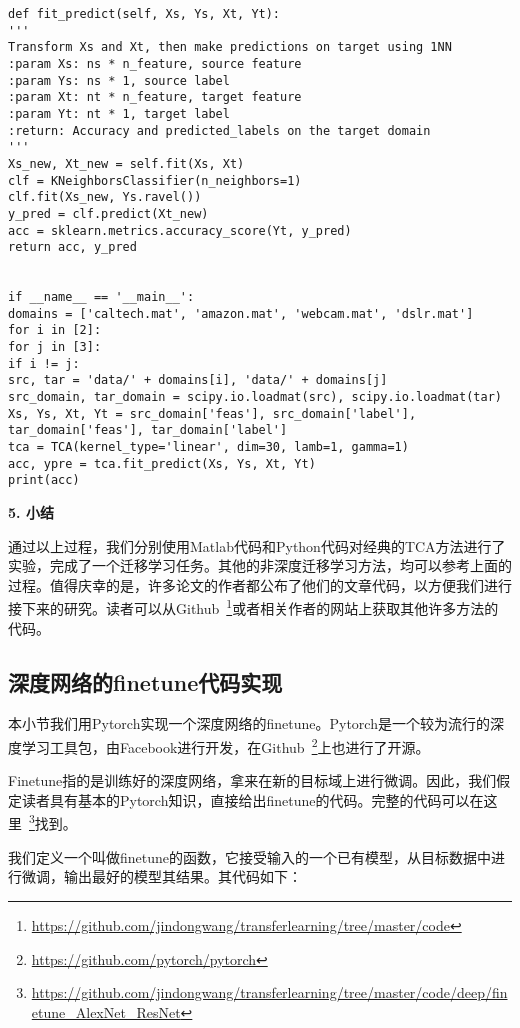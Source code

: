 \begin{lstlisting}[title=TCA方法的Python实现, frame=shadowbox]
def fit_predict(self, Xs, Ys, Xt, Yt):
'''
Transform Xs and Xt, then make predictions on target using 1NN
:param Xs: ns * n_feature, source feature
:param Ys: ns * 1, source label
:param Xt: nt * n_feature, target feature
:param Yt: nt * 1, target label
:return: Accuracy and predicted_labels on the target domain
'''
Xs_new, Xt_new = self.fit(Xs, Xt)
clf = KNeighborsClassifier(n_neighbors=1)
clf.fit(Xs_new, Ys.ravel())
y_pred = clf.predict(Xt_new)
acc = sklearn.metrics.accuracy_score(Yt, y_pred)
return acc, y_pred


if __name__ == '__main__':
domains = ['caltech.mat', 'amazon.mat', 'webcam.mat', 'dslr.mat']
for i in [2]:
for j in [3]:
if i != j:
src, tar = 'data/' + domains[i], 'data/' + domains[j]
src_domain, tar_domain = scipy.io.loadmat(src), scipy.io.loadmat(tar)
Xs, Ys, Xt, Yt = src_domain['feas'], src_domain['label'], tar_domain['feas'], tar_domain['label']
tca = TCA(kernel_type='linear', dim=30, lamb=1, gamma=1)
acc, ypre = tca.fit_predict(Xs, Ys, Xt, Yt)
print(acc)

\end{lstlisting}

\textbf{5. 小结}

通过以上过程，我们分别使用Matlab代码和Python代码对经典的TCA方法进行了实验，完成了一个迁移学习任务。其他的非深度迁移学习方法，均可以参考上面的过程。值得庆幸的是，许多论文的作者都公布了他们的文章代码，以方便我们进行接下来的研究。读者可以从Github~\footnote{\url{https://github.com/jindongwang/transferlearning/tree/master/code}}或者相关作者的网站上获取其他许多方法的代码。

\subsection{深度网络的finetune代码实现}

本小节我们用Pytorch实现一个深度网络的finetune。Pytorch是一个较为流行的深度学习工具包，由Facebook进行开发，在Github~\footnote{\url{https://github.com/pytorch/pytorch}}上也进行了开源。

Finetune指的是训练好的深度网络，拿来在新的目标域上进行微调。因此，我们假定读者具有基本的Pytorch知识，直接给出finetune的代码。完整的代码可以在这里~\footnote{\url{https://github.com/jindongwang/transferlearning/tree/master/code/deep/finetune_AlexNet_ResNet}}找到。

我们定义一个叫做finetune的函数，它接受输入的一个已有模型，从目标数据中进行微调，输出最好的模型其结果。其代码如下：

